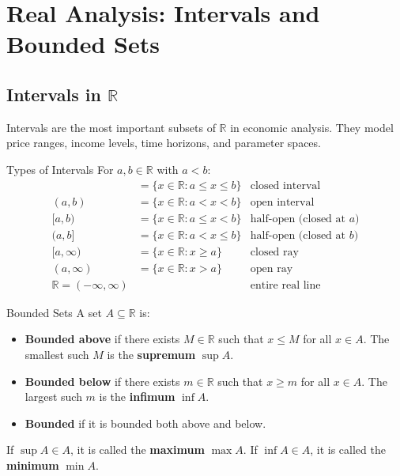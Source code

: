 \documentclass[12pt, a4paper]{article}
\theoremstyle{definition}
\newcommand{\R}{\mathbb{R}}
\begin{document}
\section{Real Analysis: Intervals and Bounded Sets}

\subsection{Intervals in $\R$}

Intervals are the most important subsets of $\R$ in economic analysis. They model price ranges, income levels, time horizons, and parameter spaces.

\begin{defbox}{Types of Intervals}
For $a, b \in \R$ with $a < b$:
\begin{align*}
  [a,b]   &= \{x \in \R : a \leq x \leq b\} &\text{closed interval}\\
  (a,b)   &= \{x \in \R : a < x < b\}        &\text{open interval}\\
  [a,b)   &= \{x \in \R : a \leq x < b\}     &\text{half-open (closed at $a$)}\\
  (a,b]   &= \{x \in \R : a < x \leq b\}     &\text{half-open (closed at $b$)}\\
  [a,\infty) &= \{x \in \R : x \geq a\}       &\text{closed ray}\\
  (a,\infty) &= \{x \in \R : x > a\}          &\text{open ray}\\
  \R = (-\infty,\infty) & & \text{entire real line}
\end{align*}
\end{defbox}

\begin{defbox}{Bounded Sets}
A set $A \subseteq \R$ is:
\begin{itemize}
  \item \textbf{Bounded above} if there exists $M \in \R$ such that $x \leq M$ for all $x \in A$. The smallest such $M$ is the \textbf{supremum} $\sup A$.
  \item \textbf{Bounded below} if there exists $m \in \R$ such that $x \geq m$ for all $x \in A$. The largest such $m$ is the \textbf{infimum} $\inf A$.
  \item \textbf{Bounded} if it is bounded both above and below.
\end{itemize}
If $\sup A \in A$, it is called the \textbf{maximum} $\max A$. If $\inf A \in A$, it is called the \textbf{minimum} $\min A$.
\end{defbox}
\end{document}
